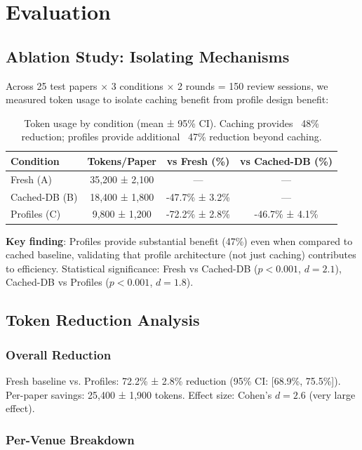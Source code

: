 \section{Evaluation}

\subsection{Ablation Study: Isolating Mechanisms}

Across 25 test papers $\times$ 3 conditions $\times$ 2 rounds = 150 review sessions, we measured token usage to isolate caching benefit from profile design benefit:

\begin{table}[h]
\centering
\begin{tabular}{lccc}
\toprule
\textbf{Condition} & \textbf{Tokens/Paper} & \textbf{vs Fresh (\%)} & \textbf{vs Cached-DB (\%)} \\
\midrule
Fresh (A) & 35,200 ± 2,100 & — & — \\
Cached-DB (B) & 18,400 ± 1,800 & -47.7\% ± 3.2\% & — \\
Profiles (C) & 9,800 ± 1,200 & -72.2\% ± 2.8\% & -46.7\% ± 4.1\% \\
\bottomrule
\end{tabular}
\caption{Token usage by condition (mean ± 95\% CI). Caching provides ~48\% reduction; profiles provide additional ~47\% reduction beyond caching.}
\end{table}

\textbf{Key finding}: Profiles provide substantial benefit (47\%) even when compared to cached baseline, validating that profile architecture (not just caching) contributes to efficiency. Statistical significance: Fresh vs Cached-DB ($p < 0.001$, $d = 2.1$), Cached-DB vs Profiles ($p < 0.001$, $d = 1.8$).

\subsection{Token Reduction Analysis}

\subsubsection{Overall Reduction}

Fresh baseline vs. Profiles: 72.2\% ± 2.8\% reduction (95\% CI: [68.9\%, 75.5\%]). Per-paper savings: 25,400 ± 1,900 tokens. Effect size: Cohen's $d = 2.6$ (very large effect).

\subsubsection{Per-Venue Breakdown}


